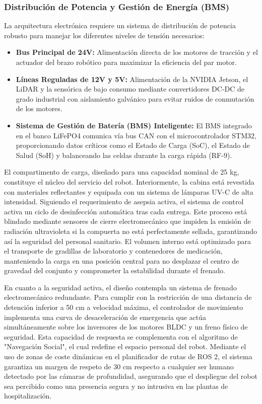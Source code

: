 \subsubsection{Distribución de Potencia y Gestión de Energía (BMS)}
La arquitectura electrónica requiere un sistema de distribución de potencia robusto para manejar los diferentes niveles de tensión necesarios:
\begin{itemize}
    \item \textbf{Bus Principal de 24V:} Alimentación directa de los motores de tracción y el actuador del brazo robótico para maximizar la eficiencia del par motor.
    \item \textbf{Líneas Reguladas de 12V y 5V:} Alimentación de la NVIDIA Jetson, el LiDAR y la sensórica de bajo consumo mediante convertidores DC-DC de grado industrial con aislamiento galvánico para evitar ruidos de conmutación de los motores.
    \item \textbf{Sistema de Gestión de Batería (BMS) Inteligente:} El BMS integrado en el banco LiFePO4 comunica vía bus CAN con el microcontrolador STM32, proporcionando datos críticos como el Estado de Carga (SoC), el Estado de Salud (SoH) y balanceando las celdas durante la carga rápida (RF-9).
\end{itemize}

El compartimento de carga, diseñado para una capacidad nominal de 25 kg, constituye el núcleo del servicio del robot. Interiormente, la cabina está revestida con materiales reflectantes y equipada con un sistema de lámparas UV-C de alta intensidad. Siguiendo el requerimiento de asepsia activa, el sistema de control activa un ciclo de desinfección automática tras cada entrega. Este proceso está blindado mediante sensores de cierre electromecánico que impiden la emisión de radiación ultravioleta si la compuerta no está perfectamente sellada, garantizando así la seguridad del personal sanitario. El volumen interno está optimizado para el transporte de gradillas de laboratorio y contenedores de medicación, manteniendo la carga en una posición central para no desplazar el centro de gravedad del conjunto y comprometer la estabilidad durante el frenado.

En cuanto a la seguridad activa, el diseño contempla un sistema de frenado electromecánico redundante. Para cumplir con la restricción de una distancia de detención inferior a 50 cm a velocidad máxima, el controlador de movimiento implementa una curva de desaceleración de emergencia que actúa simultáneamente sobre los inversores de los motores BLDC y un freno físico de seguridad. Esta capacidad de respuesta se complementa con el algoritmo de "Navegación Social", el cual redefine el espacio personal del robot. Mediante el uso de zonas de coste dinámicas en el planificador de rutas de ROS 2, el sistema garantiza un margen de respeto de 30 cm respecto a cualquier ser humano detectado por las cámaras de profundidad, asegurando que el despliegue del robot sea percibido como una presencia segura y no intrusiva en las plantas de hospitalización.

